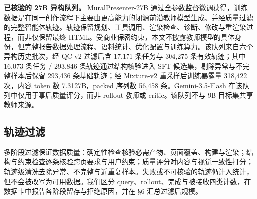 \textbf{已核验的 27B 异构队列。} MuralPresenter-27B 通过全参数监督微调获得，训练数据是在同一创作流程下主要由更高能力的闭源前沿教师模型生成、并经质量过滤的完整智能体轨迹。轨迹保留规划、工具调用、渲染检查、诊断、修改与重渲染过程，而非仅保留最终 HTML。受商业保密约束，本文不披露教师模型的具体身份，但完整报告数据处理流程、语料统计、优化配置与训练算力。该队列来自六个异构历史批次，经 QC-v2 过滤后含 17,171 条任务与 304,275 条有效轨迹；其中 16,073 条任务 / 293,846 条轨迹通过结构核验进入 SFT 候选集，剔除异常与不完整样本后保留 293,436 条基础轨迹；经 Mixture-v2 重采样后训练暴露量 318,422 次，内容 token 数 7.3127B，packed 序列数 56,458 条。Gemini-3.5-Flash 在该队列中仅用于事后质量评分，而非 rollout 教师或 critic。该队列不与 9B 目标集共享教师来源。

\subsection{轨迹过滤}

多阶段过滤保证数据质量：确定性检查核验必需产物、页面覆盖、构建与渲染；结构与约束检查逐条核验跨页要求与用户约束；质量评分对内容与视觉一致性打分；轨迹级清洗去除异常、不完整与近重复样本。失败或不可核验的轨迹仍计入统计，但不会被改写为可用数据。我们区分 query、rollout、完成与被接收四类计数，在数据卡中报告各阶段留存与拒绝原因，并在 §6 汇总过滤后规模。
